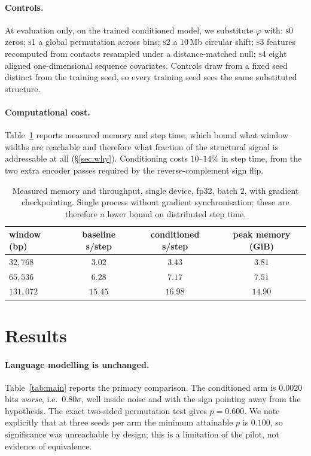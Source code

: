 \documentclass[10pt]{article}
\begin{document}
\paragraph{Controls.} At evaluation only, on the trained conditioned model, we
substitute $\varphi$ with: \textsc{s0} zeros; \textsc{s1} a global permutation
across bins; \textsc{s2} a $10$\,Mb circular shift; \textsc{s3} features
recomputed from contacts resampled under a distance-matched null; \textsc{s4}
eight aligned one-dimensional sequence covariates. Controls draw from a fixed
seed distinct from the training seed, so every training seed sees the same
substituted structure.

\paragraph{Computational cost.}
Table~\ref{tab:cost} reports measured memory and step time, which bound what
window widths are reachable and therefore what fraction of the structural signal
is addressable at all (\S\ref{sec:why}). Conditioning costs $10$--$14\%$ in step
time, from the two extra encoder passes required by the reverse-complement
sign flip.

\begin{table}[t]
\centering\small
\caption{Measured memory and throughput, single device, fp32, batch $2$, with
gradient checkpointing. Single process without gradient synchronisation; these
are therefore a lower bound on distributed step time.}
\label{tab:cost}
\begin{tabular}{lccc}
\toprule
window (bp) & baseline s/step & conditioned s/step & peak memory (GiB) \\
\midrule
$32{,}768$  & $3.02$  & $3.43$  & $3.81$ \\
$65{,}536$  & $6.28$  & $7.17$  & $7.51$ \\
$131{,}072$ & $15.45$ & $16.98$ & $14.90$ \\
\bottomrule
\end{tabular}
\end{table}

\section{Results}
\label{sec:results}

\paragraph{Language modelling is unchanged.}
Table~\ref{tab:main} reports the primary comparison. The conditioned arm is
$0.0020$ bits \emph{worse}, i.e.\ $0.80\sigma$, well inside noise and with the
sign pointing away from the hypothesis. The exact two-sided permutation test
gives $p = 0.600$. We note explicitly that at three seeds per arm the minimum
attainable $p$ is $0.100$, so significance was unreachable by design; this is a
limitation of the pilot, not evidence of equivalence.
\end{document}
